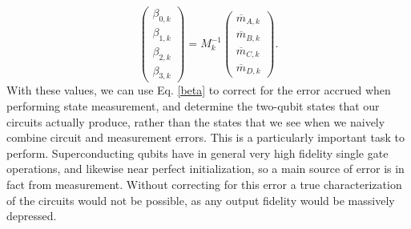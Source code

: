 \begin{equation}
  \begin{pmatrix}
    \beta_{0,k} \\ \beta_{1,k} \\ \beta_{2,k} \\ \beta_{3,k}
  \end{pmatrix} = M_k^{-1}
  \begin{pmatrix}
    \overline{m}_{A,k} \\ \overline{m}_{B,k} \\ \overline{m}_{C,k}
    \\ \overline{m}_{D,k}
  \end{pmatrix}.
\end{equation}
With these values, we can use Eq. \ref{beta} to correct for the error accrued
when performing state measurement, and determine the two-qubit states that our
circuits actually produce, rather than the states that we see when we naively
combine circuit and measurement errors. This is a particularly important task to
perform. Superconducting qubits have in general very high fidelity single gate
operations, and likewise near perfect initialization, so a main source of error
is in fact from measurement. Without correcting for this error a true
characterization of the circuits would not be possible, as any output fidelity
would be massively depressed.


